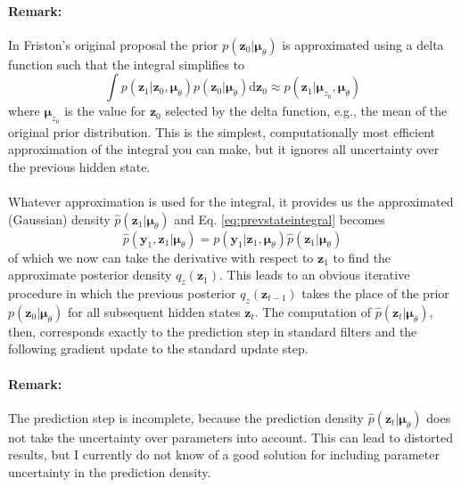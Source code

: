 \documentclass[a4paper,10pt]{article}
\newcommand{\bs}[1]{\mathbf{#1}}					%
\newcommand{\bgs}[1]{\boldsymbol{#1}}				%
\newcommand{\ud}{\mathrm{d}}					%
\newcommand{\eq}[1]{\begin{equation} #1 \end{equation}}%
\renewcommand{\ss}{z}         %
\newcommand{\so}{y}         %
\newcommand{\spm}{\mu}    %
\renewcommand{\sp}{\theta}    %
\newcommand{\ps}{\bs{\ss}}    %
\newcommand{\po}{\bs{\so}}    %
\newcommand{\ppm}{\bgs{\spm}}   %
\begin{document}
\paragraph{Remark:} In Friston's original proposal \cite{Friston2008a, Friston2008} the prior $p(\ps_0|\ppm_\sp)$ is approximated using a delta function such that the integral simplifies to
\eq{
    \int p(\ps_1|\ps_0,\ppm_\sp)p(\ps_0|\ppm_\sp) \ud\ps_0 \approx p(\ps_1|\ppm_{\ss_0}, \ppm_\sp)
}
where $\ppm_{\ss_0}$ is the value for $\ps_0$ selected by the delta function, e.g., the mean of the original prior distribution. This is the simplest, computationally most efficient approximation of the integral you can make, but it ignores all uncertainty over the previous hidden state.

\paragraph{}Whatever approximation is used for the integral, it provides us the approximated (Gaussian) density $\hat{p}(\ps_1|\ppm_\sp)$ and Eq. \ref{eq:prevstateintegral} becomes
\eq{
     \hat{p}(\po_1,\ps_1|\ppm_\sp) = p(\po_1|\ps_1,\ppm_\sp) \hat{p}(\ps_1|\ppm_\sp)
}
of which we now can take the derivative with respect to $\ps_1$ to find the approximate posterior density $q_\ss(\ps_1)$. This leads to an obvious iterative procedure in which the previous posterior $q_\ss(\ps_{t-1})$ takes the place of the prior $p(\ps_0|\ppm_\sp)$ for all subsequent hidden states $\ps_t$. The computation of $\hat{p}(\ps_t|\ppm_\sp)$, then, corresponds exactly to the prediction step in standard filters and the following gradient update to the standard update step. 

\paragraph{Remark:} The prediction step is incomplete, because the prediction density $\hat{p}(\ps_t|\ppm_\sp)$ does not take the uncertainty over parameters into account. This can lead to distorted results, but I currently do not know of a good solution for including parameter uncertainty in the prediction density.
\end{document}
